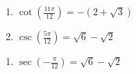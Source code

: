 \documentclass{ximera}
\begin{document}
\begin{multicols}{2}

\begin{enumerate}

\setcounter{enumi}{\value{HW}}

\item $\cot \left( \frac{11\pi}{12} \right) = -(2 + \sqrt{3})$
\item $\csc \left( \frac{5\pi}{12} \right) = \sqrt{6} - \sqrt{2}$

\setcounter{HW}{\value{enumi}}

\end{enumerate}

\end{multicols}

\begin{multicols}{2}

\begin{enumerate}

\setcounter{enumi}{\value{HW}}

\item $\sec \left( -\frac{\pi}{12} \right) = \sqrt{6} - \sqrt{2}$

\setcounter{HW}{\value{enumi}}

\end{enumerate}

\end{multicols}
\end{document}
